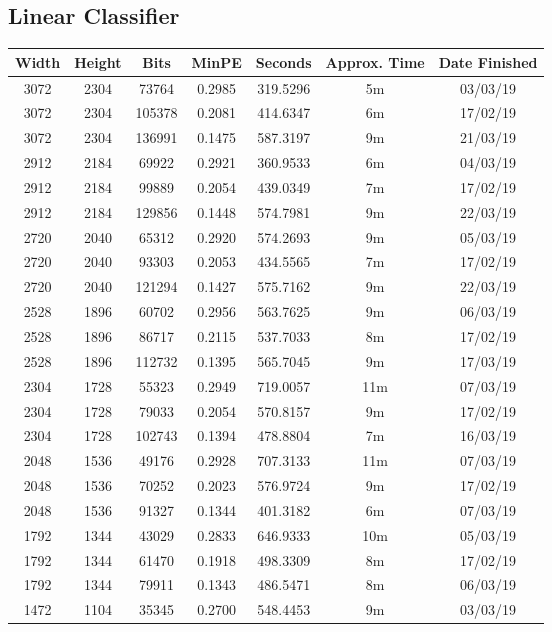 \subsection{Linear Classifier}
  \begin{center}
  \begin{tabular}{ c c c | c | c c c }
  Width & Height & Bits & MinPE & Seconds & Approx. Time & Date Finished \\ \hline
  3072 & 2304 & 73764 & 0.2985 & 319.5296 & 5m & 03/03/19 \\
  3072 & 2304 & 105378 & 0.2081 & 414.6347 & 6m & 17/02/19 \\
  3072 & 2304 & 136991 & 0.1475 & 587.3197 & 9m & 21/03/19 \\
  2912 & 2184 & 69922 & 0.2921 & 360.9533 & 6m & 04/03/19 \\
  2912 & 2184 & 99889 & 0.2054 & 439.0349 & 7m & 17/02/19 \\
  2912 & 2184 & 129856 & 0.1448 & 574.7981 & 9m & 22/03/19 \\
  2720 & 2040 & 65312 & 0.2920 & 574.2693 & 9m & 05/03/19 \\
  2720 & 2040 & 93303 & 0.2053 & 434.5565 & 7m & 17/02/19 \\
  2720 & 2040 & 121294 & 0.1427 & 575.7162 & 9m & 22/03/19 \\
  2528 & 1896 & 60702 & 0.2956 & 563.7625 & 9m & 06/03/19 \\
  2528 & 1896 & 86717 & 0.2115 & 537.7033 & 8m & 17/02/19 \\
  2528 & 1896 & 112732 & 0.1395 & 565.7045 & 9m & 17/03/19 \\
  2304 & 1728 & 55323 & 0.2949 & 719.0057 & 11m & 07/03/19 \\
  2304 & 1728 & 79033 & 0.2054 & 570.8157 & 9m & 17/02/19 \\
  2304 & 1728 & 102743 & 0.1394 & 478.8804 & 7m & 16/03/19 \\
  2048 & 1536 & 49176 & 0.2928 & 707.3133 & 11m & 07/03/19 \\
  2048 & 1536 & 70252 & 0.2023 & 576.9724 & 9m & 17/02/19 \\
  2048 & 1536 & 91327 & 0.1344 & 401.3182 & 6m & 07/03/19 \\
  1792 & 1344 & 43029 & 0.2833 & 646.9333 & 10m & 05/03/19 \\
  1792 & 1344 & 61470 & 0.1918 & 498.3309 & 8m & 17/02/19 \\
  1792 & 1344 & 79911 & 0.1343 & 486.5471 & 8m & 06/03/19 \\
  1472 & 1104 & 35345 & 0.2700 & 548.4453 & 9m & 03/03/19 \\

\end{tabular}
\end{center}

